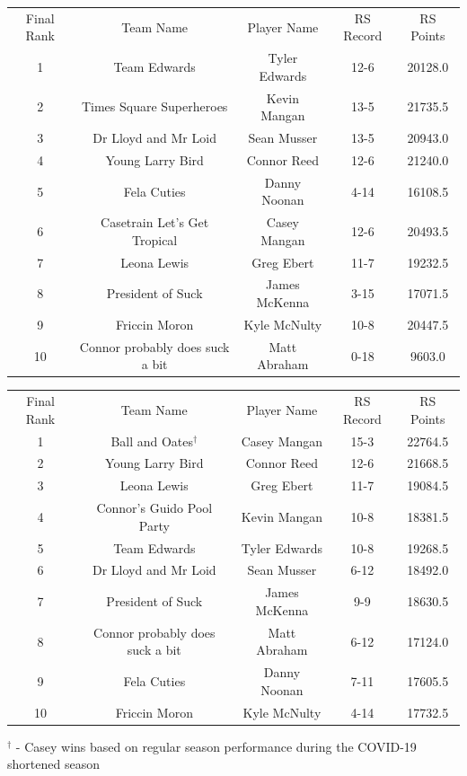 \documentclass[11pt,letterpaper]{article}
\begin{document}
\newpage
{}
\vspace{-25pt}
\begin{table} [h]
\begin{center}
\begin{tabular} { c c c c c }
\\ Final Rank & Team Name & Player Name & RS Record & RS Points
\\ 1 & Team Edwards & Tyler Edwards & 12-6 & 20128.0
\\ 2 & Times Square Superheroes & Kevin Mangan & 13-5 & 21735.5
\\ 3 & Dr Lloyd and Mr Loid & Sean Musser & 13-5 & 20943.0
\\ 4 & Young Larry Bird & Connor Reed & 12-6 & 21240.0
\\ 5 & Fela Cuties & Danny Noonan & 4-14 & 16108.5
\\ 6 & Casetrain Let's Get Tropical & Casey Mangan & 12-6 & 20493.5
\\ 7 & Leona Lewis & Greg Ebert & 11-7 & 19232.5
\\ 8 & President of Suck & James McKenna & 3-15 & 17071.5
\\ 9 & Friccin Moron & Kyle McNulty & 10-8 & 20447.5
\\ 10 & Connor probably does suck a bit & Matt Abraham & 0-18 & 9603.0
\end{tabular}
\end{center}
\end{table}

\vspace{-25pt}
\begin{table} [h]
\begin{center}
\begin{tabular} { c c c c c }
\\ Final Rank & Team Name & Player Name & RS Record & RS Points
\\ 1 & Ball and Oates$^\dag$ & Casey Mangan & 15-3 & 22764.5
\\ 2 & Young Larry Bird & Connor Reed & 12-6 & 21668.5
\\ 3 & Leona Lewis & Greg Ebert & 11-7 & 19084.5
\\ 4 & Connor's Guido Pool Party & Kevin Mangan & 10-8 & 18381.5
\\ 5 & Team Edwards & Tyler Edwards & 10-8 & 19268.5
\\ 6 & Dr Lloyd and Mr Loid & Sean Musser & 6-12 & 18492.0
\\ 7 & President of Suck & James McKenna & 9-9 & 18630.5
\\ 8 & Connor probably does suck a bit & Matt Abraham & 6-12 & 17124.0
\\ 9 & Fela Cuties & Danny Noonan & 7-11 & 17605.5
\\ 10 & Friccin Moron & Kyle McNulty & 4-14 & 17732.5
\end{tabular}
\end{center}
\noindent$^\dag$ - Casey wins based on regular season performance during the COVID-19 shortened season
\end{table}
\end{document}
